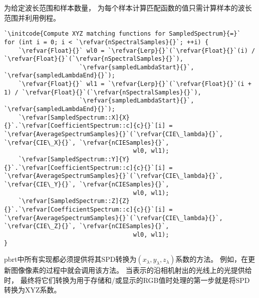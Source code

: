 为给定波长范围和样本数量，
为每个样本计算匹配函数的值只需计算样本的波长范围并利用例程。
\begin{lstlisting}
`\initcode{Compute XYZ matching functions for SampledSpectrum}{=}`
for (int i = 0; i < `\refvar{nSpectralSamples}{}`; ++i) {
    `\refvar{Float}{}` wl0 = `\refvar{Lerp}{}`(`\refvar{Float}{}`(i) / `\refvar{Float}{}`(`\refvar{nSpectralSamples}{}`), 
                     `\refvar{sampledLambdaStart}{}`, `\refvar{sampledLambdaEnd}{}`);
    `\refvar{Float}{}` wl1 = `\refvar{Lerp}{}`(`\refvar{Float}{}`(i + 1) / `\refvar{Float}{}`(`\refvar{nSpectralSamples}{}`), 
                     `\refvar{sampledLambdaStart}{}`, `\refvar{sampledLambdaEnd}{}`);
    `\refvar[SampledSpectrum::X]{X}{}`.`\refvar[CoefficientSpectrum::c]{c}{}`[i] = `\refvar{AverageSpectrumSamples}{}`(`\refvar{CIE\_lambda}{}`, `\refvar{CIE\_X}{}`, `\refvar{nCIESamples}{}`,
                                    wl0, wl1);
    `\refvar[SampledSpectrum::Y]{Y}{}`.`\refvar[CoefficientSpectrum::c]{c}{}`[i] = `\refvar{AverageSpectrumSamples}{}`(`\refvar{CIE\_lambda}{}`, `\refvar{CIE\_Y}{}`, `\refvar{nCIESamples}{}`,
                                    wl0, wl1);
    `\refvar[SampledSpectrum::Z]{Z}{}`.`\refvar[CoefficientSpectrum::c]{c}{}`[i] = `\refvar{AverageSpectrumSamples}{}`(`\refvar{CIE\_lambda}{}`, `\refvar{CIE\_Z}{}`, `\refvar{nCIESamples}{}`,
                                    wl0, wl1);
}
\end{lstlisting}

pbrt中所有实现都必须提供将其SPD转换为$(x_{\lambda},y_{\lambda},z_{\lambda})$系数的方法。
例如，在更新图像像素的过程中就会调用该方法。
当表示的沿相机射出的光线上的光提供给时，
最终将它们转换为用于存储和/或显示的RGB值时处理的第一步就是将SPD转换为XYZ系数。

